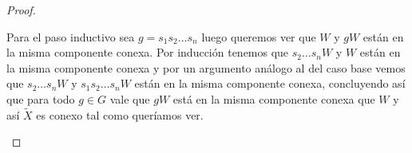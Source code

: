 \documentclass[tesis.tex]{subfiles}
\begin{document}
\begin{proof}
\begin{itemize}
		Para el paso inductivo sea $g = s_{1}s_{2}\dots s_{n}$ luego queremos ver que $W$ y $gW$ están en la misma componente conexa.
		Por inducción tenemos que $s_{2}\dots s_{n}W$ y $W$ están en la misma componente conexa y por un argumento análogo al del caso base vemos que $s_{2}\dots s_{n}W$ y $s_{1}s_{2}\dots s_{n}W$ están en la misma componente conexa, concluyendo así que para todo $g \in G$ vale que $gW$ está en la misma componente conexa que $W$ y así $\widetilde{X}$ es conexo tal como queríamos ver.


		
		
		
			
		
		

\end{itemize}
\end{proof}
\end{document}
